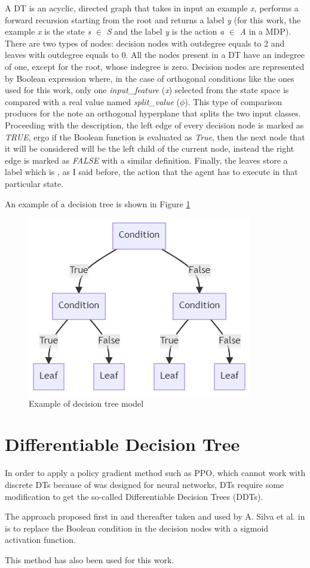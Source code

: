 A DT is an acyclic, directed graph that takes in input an example \textit{x}, performs a forward recursion starting from the root and returns a label \textit{y} (for this work, the example \textit{x} is the state \textit{s} \(\in\) \textit{S} and the label \textit{y} is the action \textit{a} \(\in\) \textit{A} in a MDP). There are two types of nodes: decision nodes with outdegree equals to 2 and leaves with outdegree equals to 0. All the nodes present in a DT have an indegree of one, except for the root, whose indegree is zero. Decision nodes are represented by Boolean expression where, in the case of orthogonal conditions like the ones used for this work, only one \textit{input\_feature} (\textit{x}) selected from the state space is compared with a real value named \textit{split\_value} (\(\phi\)). This type of comparison produces for the note an orthogonal hyperplane that splits the two input classes. Proceeding with the description, the left edge of every decision node is marked as \textit{TRUE}, ergo if the Boolean function is evaluated as \textit{True}, then the next node that it will be considered will be the left child of the current node, instead the right edge is marked as \textit{FALSE} with a similar definition. Finally, the leaves store a label which is , as I said before, the action that the agent has to execute in that particular state.

An example of a decision tree is shown in Figure \ref{fig:dt}

\begin{figure}[h!]
    \centering
    \includegraphics[width=0.5\linewidth]{images/DecisionTree.png}
    \caption{Example of decision tree model}
    \label{fig:dt}
\end{figure}

\newpage

\section{Differentiable Decision Tree}
\label{sec:160}
In order to apply a policy gradient method such as PPO, which cannot work with discrete DTs because of was designed for neural networks, DTs require some modification to get the so-called Differentiable Decision Trees (DDTs).

The approach proposed first in \cite{suarez} and thereafter taken and used by A. Silva et al. in \cite{silva} is to replace the Boolean condition in the decision nodes with a sigmoid activation function.

This method has also been used for this work.
\newpage
